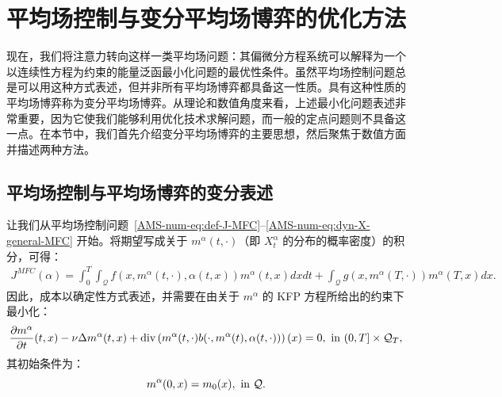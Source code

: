 \documentclass{amsproc}
\theoremstyle{definition}
\theoremstyle{remark}
\numberwithin{equation}{section}
\newcommand{\ctrl}{\alpha}
\newcommand{\dom}{\mathcal{Q}}
\newcommand{\domT}{\mathcal{Q}_{T}}
\newcommand{\diver}{\mathrm{div}}
\begin{document}
\clearpage


\section{\bf 平均场控制与变分平均场博弈的优化方法}
\label{AMS-num-sec:optim-variational}

现在，我们将注意力转向这样一类平均场问题：其偏微分方程系统可以解释为一个以连续性方程为约束的能量泛函最小化问题的最优性条件。虽然平均场控制问题总是可以用这种方式表述，但并非所有平均场博弈都具备这一性质。具有这种性质的平均场博弈称为变分平均场博弈。从理论和数值角度来看，上述最小化问题表述非常重要，因为它使我们能够利用优化技术求解问题，而一般的定点问题则不具备这一点。在本节中，我们首先介绍变分平均场博弈的主要思想，然后聚焦于数值方面并描述两种方法。







\subsection{平均场控制与平均场博弈的变分表述}

让我们从平均场控制问题~\eqref{AMS-num-eq:def-J-MFC}--\eqref{AMS-num-eq:dyn-X-general-MFC} 开始。将期望写成关于 $m^{\ctrl}(t, \cdot)$（即 $X_t^{\ctrl}$ 的分布的概率密度）的积分，可得：
\begin{align*}
	J^{MFC}(\ctrl) = \int_0^T \int_{\dom} f(x, m^{\ctrl}(t,\cdot), \ctrl(t,x) ) m^{\ctrl}(t,x) dx dt + \int_{\dom} g(x, m^{\ctrl}(T,\cdot)) m^{\ctrl}(T,x) dx. 
\end{align*}
因此，成本以确定性方式表述，并需要在由关于 $m^{\ctrl}$ 的 KFP 方程所给出的约束下最小化：
\begin{equation}
\label{AMS-num-eq:KFP-ctrl-Q}
	\frac{\partial m^{\ctrl}}{\partial t}(t,x)  - \nu \Delta m^{\ctrl}(t,x) + \diver\left( m^{\ctrl}(t,\cdot) b(\cdot, m^{\ctrl}(t), \ctrl(t,\cdot)) \right)(x) = 0, 
	\hbox{ in } (0,T] \times \domT ,
\end{equation}
其初始条件为：
\begin{equation}
\label{AMS-num-eq:KFP-ctrl-Q-init}
	m^{\ctrl}(0,x) = m_0(x), 
	\hbox{ in } \dom.
\end{equation}
\end{document}
